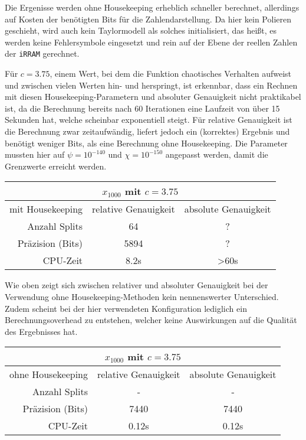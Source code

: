 Die Ergenisse werden ohne Housekeeping erheblich schneller berechnet, allerdings auf Kosten der benötigten Bits für die Zahlendarstellung. Da hier kein Polieren geschieht, wird auch kein Taylormodell als solches initialisiert, das heißt, es werden keine Fehlersymbole eingesetzt und rein auf der Ebene der reellen Zahlen der \verb+iRRAM+ gerechnet.

Für $c=3.75$, einem Wert, bei dem die Funktion chaotisches Verhalten aufweist und zwischen vielen Werten hin- und herspringt, ist erkennbar, dass ein Rechnen mit diesen Housekeeping-Parametern und absoluter Genauigkeit nicht praktikabel ist, da die Berechnung bereits nach 60 Iterationen eine Laufzeit von über 15 Sekunden hat, welche scheinbar exponentiell steigt. Für relative Genauigkeit ist die Berechnung zwar zeitaufwändig, liefert jedoch ein (korrektes) Ergebnis und benötigt weniger Bits, als eine Berechnung ohne Housekeeping. Die Parameter mussten hier auf $\psi = 10^{-140}$ und $\chi = 10^ {-150}$ angepasst werden, damit die Grenzwerte erreicht werden.

\begin{center}
\begin{tabular}{|r|c|c|}
\hline
\multicolumn{3}{|c|}{$x_{1000}$ mit $c=3.75$}\\
\hline
 mit Housekeeping &relative Genauigkeit & absolute Genauigkeit \\
 \hline
 \hline
 Anzahl Splits & 64 & ?\\
 Präzision (Bits) & 5894 & ?\\
 CPU-Zeit & 8.2s & >60s\\
 \hline
\end{tabular}
\end{center}

Wie oben zeigt sich zwischen relativer und absoluter Genauigkeit bei der Verwendung ohne Housekeeping-Methoden kein nennenswerter Unterschied. Zudem scheint bei der hier verwendeten Konfiguration lediglich ein Berechnungsoverhead zu entstehen, welcher keine Auswirkungen auf die Qualität des Ergebnisses hat.


\begin{center}
\begin{tabular}{|r|c|c|}
\hline
\multicolumn{3}{|c|}{$x_{1000}$ mit $c=3.75$}\\
\hline
 ohne Housekeeping &relative Genauigkeit & absolute Genauigkeit \\
 \hline
 \hline
 Anzahl Splits & - & -\\
 Präzision (Bits) & 7440 & 7440\\
 CPU-Zeit & 0.12s & 0.12s\\
 \hline
\end{tabular}
\end{center}


